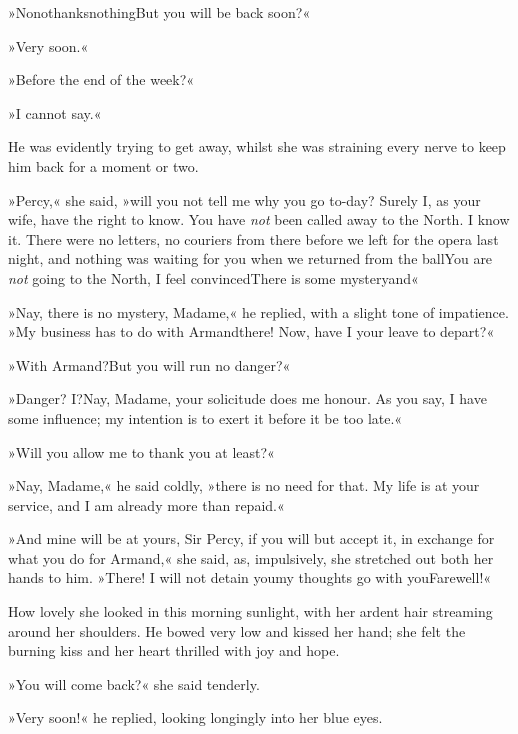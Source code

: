 »No\textellipsis \allowbreak  no\textellipsis \allowbreak  thanks\textellipsis \allowbreak  nothing\textellipsis \allowbreak  But you will be back soon?«

»Very soon.«

»Before the end of the week?«

»I cannot say.«

He was evidently trying to get away, whilst she was straining every nerve to keep him back for a moment or two.

»Percy,« she said, »will you not tell me why you go to-day? Surely I, as your wife, have the right to know. You have \textit{not} been called away to the North. I know it. There were no letters, no couriers from there before we left for the opera last night, and nothing was waiting for you when we returned from the ball\textellipsis \allowbreak  You are \textit{not} going to the North, I feel convinced\textellipsis \allowbreak  There is some mystery\textellipsis \allowbreak  and\textellipsis«

»Nay, there is no mystery, Madame,« he replied, with a slight tone of impatience. »My business has to do with Armand\textellipsis \allowbreak  there! Now, have I your leave to depart?«

»With Armand?\textellipsis \allowbreak  But you will run no danger?«

»Danger? I?\textellipsis \allowbreak  Nay, Madame, your solicitude does me honour. As you say, I have some influence; my intention is to exert it before it be too late.«

»Will you allow me to thank you at least?«

»Nay, Madame,« he said coldly, »there is no need for that. My life is at your service, and I am already more than repaid.«

»And mine will be at yours, Sir Percy, if you will but accept it, in exchange for what you do for Armand,« she said, as, impulsively, she stretched out both her hands to him. »There! I will not detain you\textellipsis \allowbreak  my thoughts go with you\textellipsis \allowbreak  Farewell!\textellipsis«

How lovely she looked in this morning sunlight, with her ardent hair streaming around her shoulders. He bowed very low and kissed her hand; she felt the burning kiss and her heart thrilled with joy and hope.

»You will come back?« she said tenderly.

»Very soon!« he replied, looking longingly into her blue eyes.

